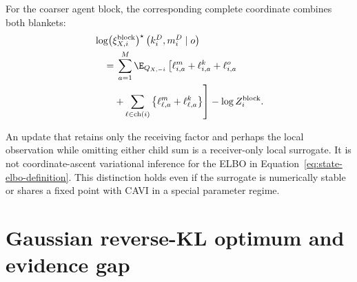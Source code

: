 For the coarser agent block, the corresponding complete coordinate combines both blankets:
\begin{align}
&\log \bigl(\xi^{\mathrm{block}}_{X,i}\bigr)^\star
\left(k_i^D,m_i^D\mid o\right)\notag\\
&\quad={}
\sum_{a=1}^{M}\E_{Q_{X,-i}}\left[
\ell_{i,a}^{m}+\ell_{i,a}^{k}+\ell_{i,a}^{o}
\right.\notag\\
&\left.\qquad+
\sum_{\ell\in\operatorname{ch}(i)}
\left\{
\ell_{\ell,a}^{m}+\ell_{\ell,a}^{k}
\right\}
\right]
-\log Z_i^{\mathrm{block}}.
\label{eq:complete-agent-block-cavi-coordinate}
\end{align}

An update that retains only the receiving factor and perhaps the local observation while omitting either child sum is a receiver-only local surrogate. It is not coordinate-ascent variational inference for the ELBO in Equation~\eqref{eq:state-elbo-definition}. This distinction holds even if the surrogate is numerically stable or shares a fixed point with CAVI in a special parameter regime.

\section{Gaussian reverse-KL optimum and evidence gap}


